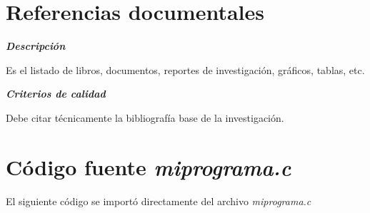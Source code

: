 \section{Referencias documentales}

\textbf{\textit{Descripción}}

Es el listado de libros, documentos, reportes de investigación, gráficos, tablas, etc.

\textbf{\textit{Criterios de calidad}}

Debe citar técnicamente la bibliografía base de la investigación.

\section{Código fuente {\it miprograma.c}}
El siguiente código se importó directamente del archivo {\it miprograma.c}

\inputminted[breaklines=true]{c}{codigo/miprograma.c}
